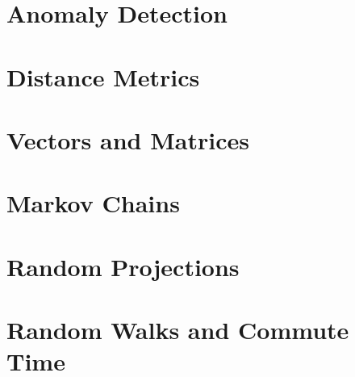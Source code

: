 \section{Anomaly Detection}
\label{anomalyDetection}


\section{Distance Metrics}
\label{distanceMetrics}


\section{Vectors and Matrices}
\label{vectorsAndMatrices}


\section{Markov Chains}
\label{markovChains}


\section{Random Projections}
\label{randomProjections}


\section{Random Walks and Commute Time}
\label{randomWalks}
\label{commuteTime}


